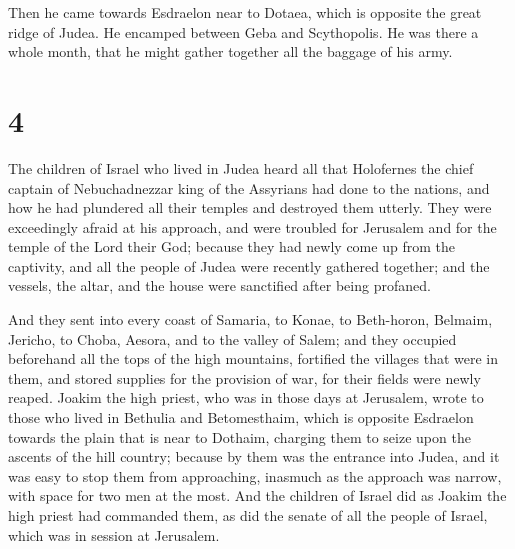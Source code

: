 Then he came towards Esdraelon near to Dotaea, which is
opposite the great ridge of Judea.  He encamped between
Geba and Scythopolis. He was there a whole month, that he might gather
together all the baggage of his army.

\hypertarget{section-3}{%
\section{4}\label{section-3}}

 The children of Israel who lived in Judea heard all that
Holofernes the chief captain of Nebuchadnezzar king of the Assyrians had
done to the nations, and how he had plundered all their temples and
destroyed them utterly.  They were exceedingly afraid at his
approach, and were troubled for Jerusalem and for the temple of the Lord
their God;  because they had newly come up from the
captivity, and all the people of Judea were recently gathered together;
and the vessels, the altar, and the house were sanctified after being
profaned.

 And they sent into every coast of Samaria, to Konae, to
Beth-horon, Belmaim, Jericho, to Choba, Aesora, and to the valley of
Salem;  and they occupied beforehand all the tops of the
high mountains, fortified the villages that were in them, and stored
supplies for the provision of war, for their fields were newly reaped.
 Joakim the high priest, who was in those days at Jerusalem,
wrote to those who lived in Bethulia and Betomesthaim, which is opposite
Esdraelon towards the plain that is near to Dothaim, 
charging them to seize upon the ascents of the hill country; because by
them was the entrance into Judea, and it was easy to stop them from
approaching, inasmuch as the approach was narrow, with space for two men
at the most.  And the children of Israel did as Joakim the
high priest had commanded them, as did the senate of all the people of
Israel, which was in session at Jerusalem.

